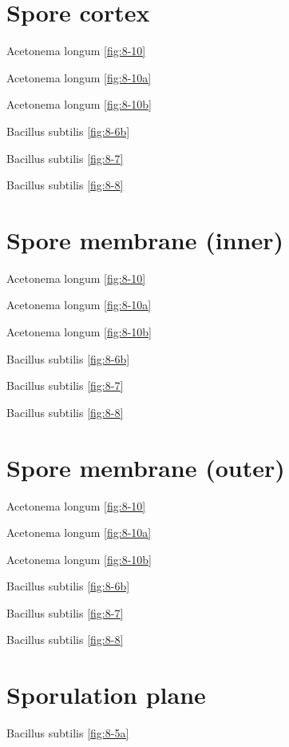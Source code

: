 \documentclass[]{tufte-book}
\begin{document}
\section*{Spore cortex}\label{spore-cortex}

Acetonema longum \ref{fig:8-10}

Acetonema longum \ref{fig:8-10a}

Acetonema longum \ref{fig:8-10b}

Bacillus subtilis \ref{fig:8-6b}

Bacillus subtilis \ref{fig:8-7}

Bacillus subtilis \ref{fig:8-8}

\section*{Spore membrane (inner)}\label{spore-membrane-inner}

Acetonema longum \ref{fig:8-10}

Acetonema longum \ref{fig:8-10a}

Acetonema longum \ref{fig:8-10b}

Bacillus subtilis \ref{fig:8-6b}

Bacillus subtilis \ref{fig:8-7}

Bacillus subtilis \ref{fig:8-8}

\section*{Spore membrane (outer)}\label{spore-membrane-outer}

Acetonema longum \ref{fig:8-10}

Acetonema longum \ref{fig:8-10a}

Acetonema longum \ref{fig:8-10b}

Bacillus subtilis \ref{fig:8-6b}

Bacillus subtilis \ref{fig:8-7}

Bacillus subtilis \ref{fig:8-8}

\section*{Sporulation plane}\label{sporulation-plane}

Bacillus subtilis \ref{fig:8-5a}
\end{document}
